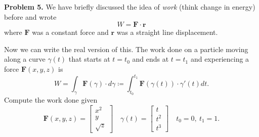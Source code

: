 \documentclass[12pt]{report} %
\theoremstyle{definition}
\begin{document}
\vspace*{.5cm}

\noindent\textbf{Problem 5.} We have briefly discussed the idea of \emph{work} (think change in energy) before and wrote
\[
W=\mathbf{F}\cdot \mathbf{r}
\]
where $\mathbf{F}$ was a constant force and $\mathbf{r}$ was a straight line displacement.

Now we can write the real version of this.  The work done on a particle moving along a curve $\gamma(t)$ that starts at $t=t_0$ and ends at $t=t_1$ and experiencing a force $\mathbf{F}(x,y,z)$ is
\[
W=\int_\gamma \mathbf{F}(\gamma)\cdot d\gamma \coloneqq \int_{t_0}^{t_1} \mathbf{F}(\gamma(t))\cdot \gamma'(t) dt.
\]
Compute the work done given
\[
\mathbf{F}(x,y,z)=\begin{bmatrix} x^2\\ y\\ \sqrt{z}\end{bmatrix} \quad \gamma(t)=\begin{bmatrix} t\\ t^2\\t^3 \end{bmatrix} \quad t_0=0, ~ t_1=1.
\]
\end{document}
